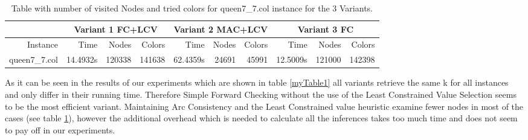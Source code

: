 \documentclass[a4paper]{scrartcl}
\begin{document}
\begin{table}
  \small
    \begin{adjustwidth}{-.5in}{-.5in}  
 \begin{center}
          \begin{tabular}{r | r | r | r | r | r | r | r | r | r}
            \hline
             & \multicolumn{3}{c|}{Variant 1 FC+LCV} & \multicolumn{3}{c|}{Variant 2 MAC+LCV} & \multicolumn{3}{c}{Variant 3 FC} \\
            \hline
Instance & Time & Nodes & Colors &  Time & Nodes & Colors & Time & Nodes & Colors \\
\hline \hline 
queen7\_7.col & 14.4932s & 120338 & 141638 & 62.4359s & 24691 & 45991 & 12.5009s  & 121000 & 142398 \\
\hline

\end{tabular}
        \caption{Table with number of visited Nodes and tried colors for queen7\_7.col instance for the 3 Variants. }
        \label{visitedTable}
        \end{center}
    \end{adjustwidth}
\end{table}

As it can be seen in the results of our experiments which are shown in table \ref{myTable1} all variants retrieve the same k for all instances and only differ in their running time. Therefore Simple Forward Checking without the use of the Least Constrained Value Selection seems to be the most efficient variant. Maintaining Arc Consistency and the Least Constrained value heuristic examine fewer nodes in most of the cases (see table \ref{visitedTable}), however the additional overhead which is needed to calculate all the inferences takes too much time and does not seem to pay off in our experiments.






\end{document}
